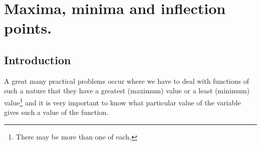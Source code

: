 
\chapter{Maxima, minima and inflection points.}%


\section{Introduction}
\label{sec:79}

A great many practical problems occur where we have to 
deal with functions of such a nature that they have a 
greatest (maximum) value or a least 
(minimum) value\footnote{There may be more than one of each.}
and it is very important to know what particular value of the 
variable gives such a value of the function. 

